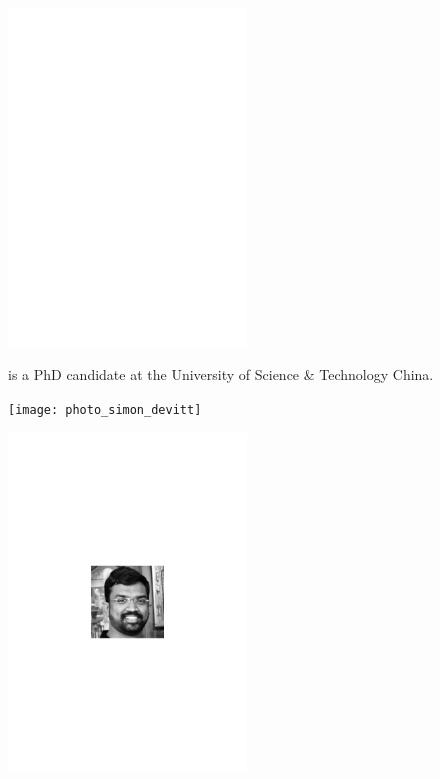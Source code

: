 \begin{center}
\includegraphics[clip=true, width=0.475\textwidth]{photo_zuen_su}
\end{center}

 is a PhD candidate at the University of Science \& Technology China.


%
%

\begin{center}
\texttt{[image: photo\_simon\_devitt]}
\end{center}



%
%

\begin{center}
\includegraphics[clip=true, width=0.475\textwidth]{photo_rohit_ramakrishnan}
\end{center}

